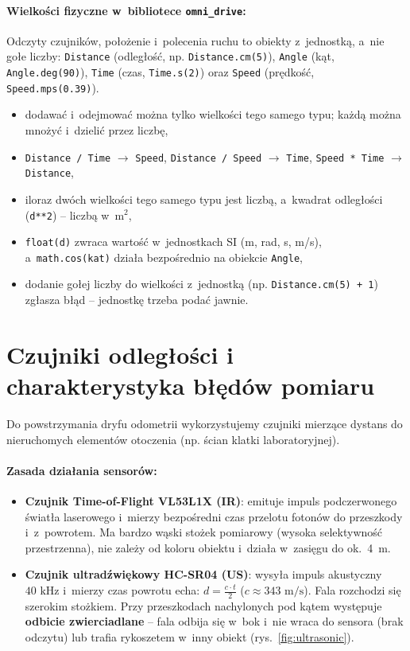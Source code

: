 \documentclass[10pt,a4paper]{article}
\begin{document}
\paragraph{Wielkości fizyczne w~bibliotece \texttt{omni\_drive}:}
Odczyty czujników, położenie i~polecenia ruchu to obiekty z~jednostką, a~nie gołe liczby: \texttt{Distance} (odległość, np. \texttt{Distance.cm(5)}), \texttt{Angle} (kąt, \texttt{Angle.deg(90)}), \texttt{Time} (czas, \texttt{Time.s(2)}) oraz \texttt{Speed} (prędkość, \texttt{Speed.mps(0.39)}).
\begin{itemize}[itemsep=2pt, topsep=2pt, parsep=0pt]
    \item dodawać i~odejmować można tylko wielkości tego samego typu; każdą można mnożyć i~dzielić przez liczbę,
    \item \texttt{Distance / Time} $\to$ \texttt{Speed}, \texttt{Distance / Speed} $\to$ \texttt{Time}, \texttt{Speed * Time} $\to$ \texttt{Distance},
    \item iloraz dwóch wielkości tego samego typu jest liczbą, a~kwadrat odległości (\texttt{d**2}) -- liczbą w~$\text{m}^2$,
    \item \texttt{float(d)} zwraca wartość w~jednostkach SI (m, rad, s, m/s), a~\texttt{math.cos(kat)} działa bezpośrednio na obiekcie \texttt{Angle},
    \item dodanie gołej liczby do wielkości z~jednostką (np. \texttt{Distance.cm(5) + 1}) zgłasza błąd -- jednostkę trzeba podać jawnie.
\end{itemize}

\clearpage

\section{Czujniki odległości i charakterystyka błędów pomiaru}

Do powstrzymania dryfu odometrii wykorzystujemy czujniki mierzące dystans do nieruchomych elementów otoczenia (np. ścian klatki laboratoryjnej).

\paragraph{Zasada działania sensorów:}
\begin{itemize}[itemsep=5pt, topsep=3pt]
    \item \textbf{Czujnik Time-of-Flight VL53L1X (IR)}: emituje impuls podczerwonego światła laserowego i~mierzy bezpośredni czas przelotu fotonów do przeszkody i~z~powrotem. Ma bardzo wąski stożek pomiarowy (wysoka selektywność przestrzenna), nie zależy od koloru obiektu i~działa w~zasięgu do ok.~4~m.
    \item \textbf{Czujnik ultradźwiękowy HC-SR04 (US)}: wysyła impuls akustyczny $40\text{ kHz}$ i~mierzy czas powrotu echa: $d = \frac{c \cdot t}{2}$ ($c \approx 343\text{ m/s}$). Fala rozchodzi się szerokim stożkiem. Przy przeszkodach nachylonych pod kątem występuje \textbf{odbicie zwierciadlane} -- fala odbija się w~bok i~nie wraca do sensora (brak odczytu) lub trafia rykoszetem w~inny obiekt (rys.~\ref{fig:ultrasonic}).
\end{itemize}
\end{document}
